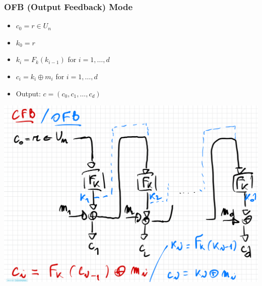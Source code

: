 \documentclass[11pt, a4paper]{article}
\begin{document}
\subsubsection*{OFB (Output Feedback) Mode} 
\begin{itemize}
    \item $c_0 = r \in U_n$ 
    \item $k_0 = r$
    \item $k_i = F_k(k_{i-1})$ for $i=1, \dots, d$ 
    \item $c_i = k_i \oplus m_i$ for $i=1, \dots, d$ 
    \item Output: $c = (c_0, c_1, \dots, c_d)$
\end{itemize}
\begin{center}
    \includegraphics[scale=0.4]{img/Symmetric/OFB.png}
\end{center}
\end{document}
